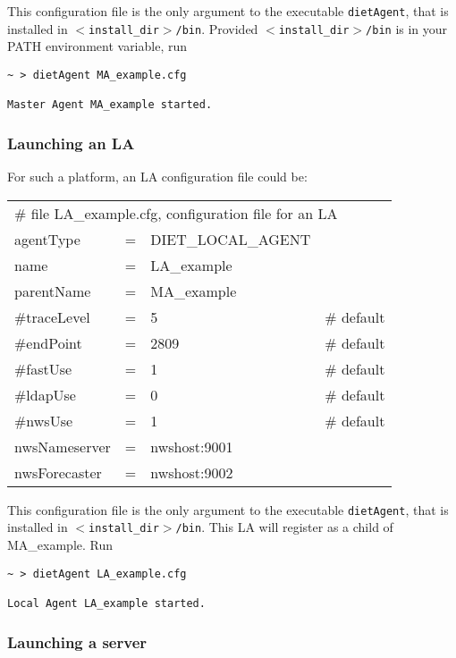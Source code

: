 This configuration file is the only argument to the executable \texttt{dietAgent},
that is installed in \texttt{$<$install\_dir$>$/bin}. Provided
\texttt{$<$install\_dir$>$/bin} is in your PATH environment variable, run
{\footnotesize
\begin{verbatim}
~ > dietAgent MA_example.cfg

Master Agent MA_example started.
\end{verbatim}
}


\subsubsection{Launching an LA}

For such a platform, an LA configuration file could be:
\tt
\begin{center}
 \footnotesize
 \begin{tabular}{lcll}
  \multicolumn{4}{l}{\# file LA\_example.cfg, configuration file for an LA}\\
  agentType    &=&DIET\_LOCAL\_AGENT&\\
  name         &=&LA\_example       &\\
  parentName   &=&MA\_example       &\\
  \#traceLevel &=&5                 &\# default\\
  \#endPoint   &=&2809              &\# default\\
  \#fastUse    &=&1                 &\# default\\
  \#ldapUse    &=&0                 &\# default\\
  \#nwsUse     &=&1                 &\# default\\
  nwsNameserver&=&nwshost:9001      &\\
  nwsForecaster&=&nwshost:9002      &\\
 \end{tabular}
\end{center}
\rm

This configuration file is the only argument to the executable
\texttt{dietAgent}, that is installed in
\texttt{$<$install\_dir$>$/bin}. This LA will register as a child of
MA\_example. Run {\footnotesize
\begin{verbatim}
~ > dietAgent LA_example.cfg

Local Agent LA_example started.
\end{verbatim}
}

\subsubsection{Launching a server}


